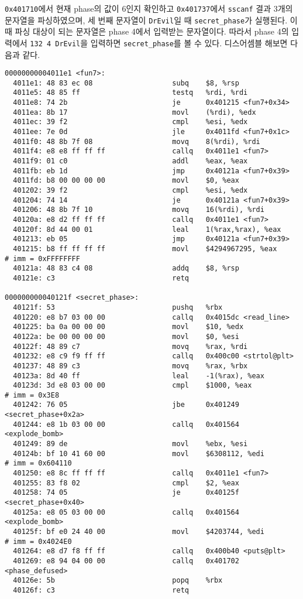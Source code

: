 \documentclass{scrartcl}
\begin{document}
\texttt{0x401710}에서 현재 phase의 값이 6인지 확인하고 \texttt{0x401737}에서
\texttt{sscanf} 결과 3개의 문자열을 파싱하였으며, 세 번째 문자열이
\texttt{DrEvil}일 때 \texttt{secret\_phase}가 실행된다. 이때 파싱 대상이 되는
문자열은 phase 4에서 입력받는 문자열이다. 따라서 phase 4의 입력에서 \texttt{132
4 DrEvil}을 입력하면 \texttt{secret\_phase}를 볼 수 있다. 디스어셈블 해보면
다음과 같다.
\begin{lstlisting}
00000000004011e1 <fun7>:
  4011e1: 48 83 ec 08                   subq    $8, %rsp
  4011e5: 48 85 ff                      testq   %rdi, %rdi
  4011e8: 74 2b                         je      0x401215 <fun7+0x34>
  4011ea: 8b 17                         movl    (%rdi), %edx
  4011ec: 39 f2                         cmpl    %esi, %edx
  4011ee: 7e 0d                         jle     0x4011fd <fun7+0x1c>
  4011f0: 48 8b 7f 08                   movq    8(%rdi), %rdi
  4011f4: e8 e8 ff ff ff                callq   0x4011e1 <fun7>
  4011f9: 01 c0                         addl    %eax, %eax
  4011fb: eb 1d                         jmp     0x40121a <fun7+0x39>
  4011fd: b8 00 00 00 00                movl    $0, %eax
  401202: 39 f2                         cmpl    %esi, %edx
  401204: 74 14                         je      0x40121a <fun7+0x39>
  401206: 48 8b 7f 10                   movq    16(%rdi), %rdi
  40120a: e8 d2 ff ff ff                callq   0x4011e1 <fun7>
  40120f: 8d 44 00 01                   leal    1(%rax,%rax), %eax
  401213: eb 05                         jmp     0x40121a <fun7+0x39>
  401215: b8 ff ff ff ff                movl    $4294967295, %eax       # imm = 0xFFFFFFFF
  40121a: 48 83 c4 08                   addq    $8, %rsp
  40121e: c3                            retq

000000000040121f <secret_phase>:
  40121f: 53                            pushq   %rbx
  401220: e8 b7 03 00 00                callq   0x4015dc <read_line>
  401225: ba 0a 00 00 00                movl    $10, %edx
  40122a: be 00 00 00 00                movl    $0, %esi
  40122f: 48 89 c7                      movq    %rax, %rdi
  401232: e8 c9 f9 ff ff                callq   0x400c00 <strtol@plt>
  401237: 48 89 c3                      movq    %rax, %rbx
  40123a: 8d 40 ff                      leal    -1(%rax), %eax
  40123d: 3d e8 03 00 00                cmpl    $1000, %eax             # imm = 0x3E8
  401242: 76 05                         jbe     0x401249 <secret_phase+0x2a>
  401244: e8 1b 03 00 00                callq   0x401564 <explode_bomb>
  401249: 89 de                         movl    %ebx, %esi
  40124b: bf 10 41 60 00                movl    $6308112, %edi          # imm = 0x604110
  401250: e8 8c ff ff ff                callq   0x4011e1 <fun7>
  401255: 83 f8 02                      cmpl    $2, %eax
  401258: 74 05                         je      0x40125f <secret_phase+0x40>
  40125a: e8 05 03 00 00                callq   0x401564 <explode_bomb>
  40125f: bf e0 24 40 00                movl    $4203744, %edi          # imm = 0x4024E0
  401264: e8 d7 f8 ff ff                callq   0x400b40 <puts@plt>
  401269: e8 94 04 00 00                callq   0x401702 <phase_defused>
  40126e: 5b                            popq    %rbx
  40126f: c3                            retq
\end{lstlisting}
\end{document}
